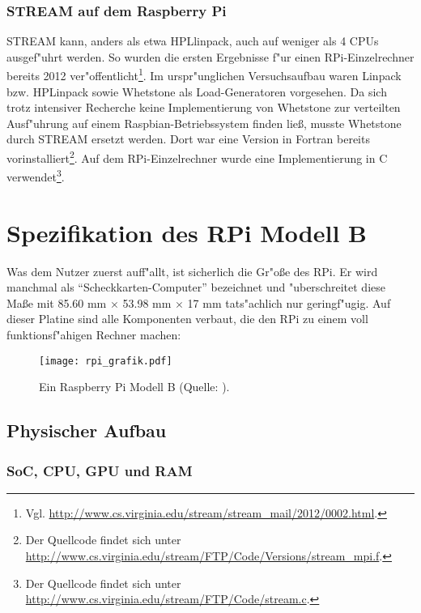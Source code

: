 \subsubsection{STREAM auf dem Raspberry Pi}\label{STREAM RPi}

STREAM kann, anders als etwa HPLlinpack, auch auf weniger als 4 CPUs ausgef"uhrt werden. So wurden die ersten Ergebnisse f"ur einen RPi-Einzelrechner bereits 2012 ver"offentlicht\footnote{Vgl. \url{http://www.cs.virginia.edu/stream/stream_mail/2012/0002.html}.}. Im urspr"unglichen Versuchsaufbau waren Linpack bzw. HPLinpack sowie Whetstone als Load-Generatoren vorgesehen. Da sich trotz intensiver Recherche keine Implementierung von Whetstone zur verteilten Ausf"uhrung auf einem Raspbian-Betriebssystem finden lie\ss, musste Whetstone durch STREAM ersetzt werden. Dort war eine Version in Fortran bereits vorinstalliert\footnote{Der Quellcode findet sich unter \mbox{\url{http://www.cs.virginia.edu/stream/FTP/Code/Versions/stream_mpi.f}.}}. Auf dem RPi-Einzelrechner wurde eine Implementierung in C verwendet\footnote{Der Quellcode findet sich unter \url{http://www.cs.virginia.edu/stream/FTP/Code/stream.c}.}.  

\section{Spezifikation des RPi Modell B}\label{RPi-Spezi}

Was dem Nutzer zuerst auff"allt, ist sicherlich die Gr"o\ss e des RPi. Er wird manchmal als "`Scheckkarten-Computer"' bezeichnet und "uberschreitet diese Ma\ss e mit 85.60 mm $\times$ 53.98 mm $\times$ 17 mm tats"achlich nur geringf"ugig. Auf dieser Platine sind alle Komponenten verbaut, die den RPi zu einem voll funktionsf"ahigen Rechner machen:
\begin{figure}[htb]
	\centering
	\texttt{[image: rpi\_grafik.pdf]}\\ 
	\caption{Ein Raspberry Pi Modell B (Quelle: \cite{scrguide01}).}\label{fig:RPi-Spezifikation}
\end{figure}

\subsection{Physischer Aufbau}\label{RPi-Hardware}

\subsubsection{SoC, CPU, GPU und RAM}

